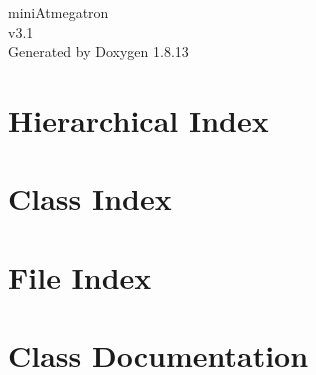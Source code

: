 \documentclass[twoside]{book}
\newcommand{\+}{\discretionary{\mbox{\scriptsize$\hookleftarrow$}}{}{}}
\newcommand{\clearemptydoublepage}{%
  \newpage{\pagestyle{empty}\cleardoublepage}%
}
\begin{document}
\hypersetup{pageanchor=false,
             bookmarksnumbered=true,
             pdfencoding=unicode
            }
\begin{titlepage}
\vspace*{7cm}
\begin{center}%
{\Large mini\+Atmegatron \\[1ex]\large v3.\+1 }\\
\vspace*{1cm}
{\large Generated by Doxygen 1.8.13}\\
\end{center}
\end{titlepage}
\clearemptydoublepage
{}
\tableofcontents
\clearemptydoublepage
{}
\hypersetup{pageanchor=true}

\chapter{Hierarchical Index}

\chapter{Class Index}

\chapter{File Index}

\chapter{Class Documentation}






























\end{document}

